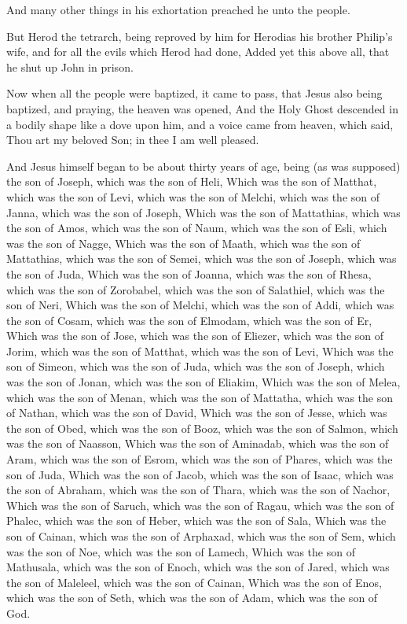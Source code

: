 \verse And many other things in his exhortation preached he unto the people.

\verse But Herod the tetrarch, being reproved by him for Herodias his brother Philip's wife, and for all the evils which Herod had done, \verse Added yet this above all, that he shut up John in prison.

\verse Now when all the people were baptized, it came to pass, that Jesus also being baptized, and praying, the heaven was opened, \verse And the Holy Ghost descended in a bodily shape like a dove upon him, and a voice came from heaven, which said, Thou art my beloved Son; in thee I am well pleased.

\verse And Jesus himself began to be about thirty years of age, being (as was supposed) the son of Joseph, which was the son of Heli, \verse Which was the son of Matthat, which was the son of Levi, which was the son of Melchi, which was the son of Janna, which was the son of Joseph, \verse Which was the son of Mattathias, which was the son of Amos, which was the son of Naum, which was the son of Esli, which was the son of Nagge, \verse Which was the son of Maath, which was the son of Mattathias, which was the son of Semei, which was the son of Joseph, which was the son of Juda, \verse Which was the son of Joanna, which was the son of Rhesa, which was the son of Zorobabel, which was the son of Salathiel, which was the son of Neri, \verse Which was the son of Melchi, which was the son of Addi, which was the son of Cosam, which was the son of Elmodam, which was the son of Er, \verse Which was the son of Jose, which was the son of Eliezer, which was the son of Jorim, which was the son of Matthat, which was the son of Levi, \verse Which was the son of Simeon, which was the son of Juda, which was the son of Joseph, which was the son of Jonan, which was the son of Eliakim, \verse Which was the son of Melea, which was the son of Menan, which was the son of Mattatha, which was the son of Nathan, which was the son of David, \verse Which was the son of Jesse, which was the son of Obed, which was the son of Booz, which was the son of Salmon, which was the son of Naasson, \verse Which was the son of Aminadab, which was the son of Aram, which was the son of Esrom, which was the son of Phares, which was the son of Juda, \verse Which was the son of Jacob, which was the son of Isaac, which was the son of Abraham, which was the son of Thara, which was the son of Nachor, \verse Which was the son of Saruch, which was the son of Ragau, which was the son of Phalec, which was the son of Heber, which was the son of Sala, \verse Which was the son of Cainan, which was the son of Arphaxad, which was the son of Sem, which was the son of Noe, which was the son of Lamech, \verse Which was the son of Mathusala, which was the son of Enoch, which was the son of Jared, which was the son of Maleleel, which was the son of Cainan, \verse Which was the son of Enos, which was the son of Seth, which was the son of Adam, which was the son of God.


